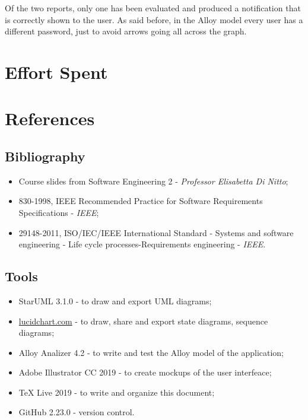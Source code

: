 \documentclass[12pt,a4paper]{report}
\begin{document}
	Of the two reports, only one has been evaluated and produced a notification that is correctly shown to the user. As said before, in the Alloy model every user has a different password, just to avoid arrows going all across the graph. 

\chapter{Effort Spent}

\chapter{References}

	\section{Bibliography}
	\begin{itemize}
	\item Course slides from Software Engineering 2 - \emph{Professor Elisabetta Di Nitto};
	\item 830-1998, IEEE Recommended Practice for Software Requirements Specifications - \emph{IEEE};
	\item 29148-2011, ISO/IEC/IEEE International Standard - Systems and software engineering - Life cycle processes-Requirements engineering - \emph{IEEE}.
	\end{itemize}

	\section{Tools}
	\begin{itemize}
	\item StarUML 3.1.0 - to draw and export UML diagrams;
	\item \url{lucidchart.com} - to draw, share and export state diagrams, sequence diagrams;
	\item Alloy Analizer 4.2 - to write and test the Alloy model of the application;
	\item Adobe Illustrator CC 2019 - to create mockups of the user interfeace;
	\item TeX Live 2019 - to write and organize this document;
	\item GitHub 2.23.0 - version control.
	\end{itemize}

\end{document}
